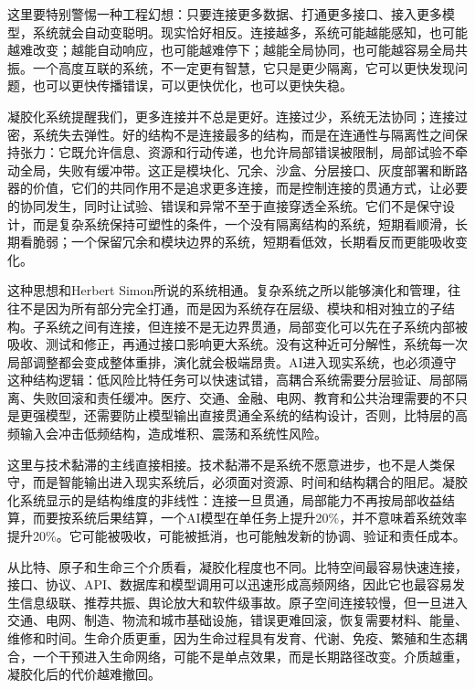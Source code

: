这里要特别警惕一种工程幻想：只要连接更多数据、打通更多接口、接入更多模型，系统就会自动变聪明。现实恰好相反。连接越多，系统可能越能感知，也可能越难改变；越能自动响应，也可能越难停下；越能全局协同，也可能越容易全局共振。一个高度互联的系统，不一定更有智慧，它只是更少隔离，它可以更快发现问题，也可以更快传播错误，可以更快优化，也可以更快失稳。

凝胶化系统提醒我们，更多连接并不总是更好。连接过少，系统无法协同；连接过密，系统失去弹性。好的结构不是连接最多的结构，而是在连通性与隔离性之间保持张力：它既允许信息、资源和行动传递，也允许局部错误被限制，局部试验不牵动全局，失败有缓冲带。这正是模块化、冗余、沙盒、分层接口、灰度部署和断路器的价值，它们的共同作用不是追求更多连接，而是控制连接的贯通方式，让必要的协同发生，同时让试验、错误和异常不至于直接穿透全系统。它们不是保守设计，而是复杂系统保持可塑性的条件，一个没有隔离结构的系统，短期看顺滑，长期看脆弱；一个保留冗余和模块边界的系统，短期看低效，长期看反而更能吸收变化。

这种思想和Herbert Simon所说的系统相通。复杂系统之所以能够演化和管理，往往不是因为所有部分完全打通，而是因为系统存在层级、模块和相对独立的子结构\cite{simon1962}。子系统之间有连接，但连接不是无边界贯通，局部变化可以先在子系统内部被吸收、测试和修正，再通过接口影响更大系统。没有这种近可分解性，系统每一次局部调整都会变成整体重排，演化就会极端昂贵。AI进入现实系统，也必须遵守这种结构逻辑：低风险比特任务可以快速试错，高耦合系统需要分层验证、局部隔离、失败回滚和责任缓冲。医疗、交通、金融、电网、教育和公共治理需要的不只是更强模型，还需要防止模型输出直接贯通全系统的结构设计，否则，比特层的高频输入会冲击低频结构，造成堆积、震荡和系统性风险。


这里与技术黏滞的主线直接相接。技术黏滞不是系统不愿意进步，也不是人类保守，而是智能输出进入现实系统后，必须面对资源、时间和结构耦合的阻尼。凝胶化系统显示的是结构维度的非线性：连接一旦贯通，局部能力不再按局部收益结算，而要按系统后果结算，一个AI模型在单任务上提升20\%，并不意味着系统效率提升20\%。它可能被吸收，可能被抵消，也可能触发新的协调、验证和责任成本。

从比特、原子和生命三个介质看，凝胶化程度也不同。比特空间最容易快速连接，接口、协议、API、数据库和模型调用可以迅速形成高频网络，因此它也最容易发生信息级联、推荐共振、舆论放大和软件级事故。原子空间连接较慢，但一旦进入交通、电网、制造、物流和城市基础设施，错误更难回滚，恢复需要材料、能量、维修和时间。生命介质更重，因为生命过程具有发育、代谢、免疫、繁殖和生态耦合，一个干预进入生命网络，可能不是单点效果，而是长期路径改变。介质越重，凝胶化后的代价越难撤回。

